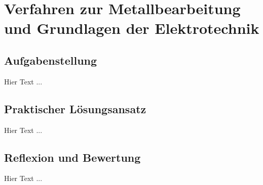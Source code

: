 \chapter{Verfahren zur Metallbearbeitung und Grundlagen der Elektrotechnik}
\label{cha:Metallbearbeitung und Elektrotechnik}

\section{Aufgabenstellung}

Hier Text ... 

\section{Praktischer Lösungsansatz}

Hier Text ... 

\section{Reflexion und Bewertung}

Hier Text ...

\clearpage

